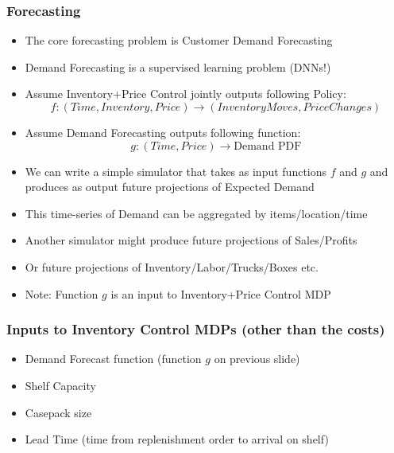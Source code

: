 \documentclass[handout]{beamer}
\begin{document}
\begin{frame}
\frametitle{Forecasting}
\pause
\begin{itemize}[<+->]
\item The core forecasting problem is Customer Demand Forecasting
\item Demand Forecasting is a supervised learning problem (DNNs!)
\item Assume Inventory+Price Control jointly outputs following Policy:
$$f: (Time, Inventory, Price) \rightarrow (Inventory Moves, Price Changes)$$
\item Assume Demand Forecasting outputs following function:
$$g:(Time, Price) \rightarrow \mbox{Demand PDF}$$
\item We can write a simple simulator that takes as input functions $f$ and $g$ and produces as output future projections of Expected Demand
\item This time-series of Demand can be aggregated by items/location/time
\item Another simulator might produce future projections of Sales/Profits
\item Or future projections of Inventory/Labor/Trucks/Boxes etc.
\item Note: Function $g$ is an input to Inventory+Price Control MDP
\end{itemize}
\end{frame}


\begin{frame}
\frametitle{Inputs to Inventory Control MDPs (other than the costs)}
\pause
\begin{itemize}[<+->]
\item Demand Forecast function (function $g$ on previous slide)
\item Shelf Capacity
\item Casepack size
\item Lead Time (time from replenishment order to arrival on shelf)
\end{itemize}
\end{frame}
\end{document}
